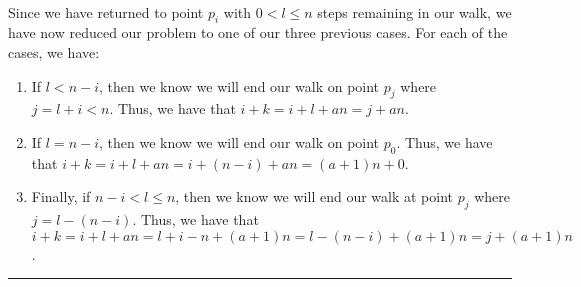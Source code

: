 \documentclass[a4paper,12pt]{article}
\begin{document}
\\
Since we have returned to point $p_i$ with $0 < l \leq n$ steps remaining in our walk, we have now reduced our problem to one of our three previous cases. For each of the cases, we have:
\begin{enumerate}
\item If $l < n - i$, then we know we will end our walk on point $p_j$ where $j = l + i < n$. Thus, we have that $i + k = i + l + an = j + an$.
\item If $l = n - i$, then we know we will end our walk on point $p_0$. Thus, we have that $i + k = i + l + an = i + (n - i) + an = (a + 1)n + 0$.
\item Finally, if $n - i < l \leq n$, then we know we will end our walk at point $p_j$ where $j = l - (n - i)$. Thus, we have that $i + k = i + l + an = l + i - n + (a + 1)n = l - (n - i) + (a + 1)n = j + (a + 1)n$.
\end{enumerate}
\begin{center}
\noindent\rule{8cm}{0.4pt}
\end{center}
\end{document}
